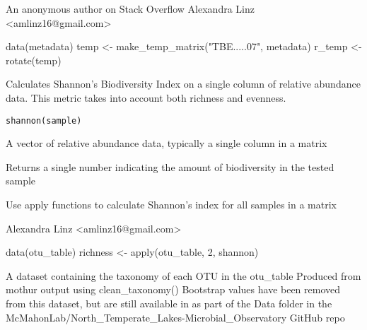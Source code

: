 \documentclass[a4paper]{book}
\begin{document}
%
\begin{Author}\relax
An anonymous author on Stack Overflow
Alexandra Linz <amlinz16@gmail.com>
\end{Author}
%
\begin{Examples}
\begin{ExampleCode}
data(metadata)
temp <- make_temp_matrix("TBE.....07", metadata)
r_temp <- rotate(temp)

\end{ExampleCode}
\end{Examples}
%
\begin{Description}\relax
Calculates Shannon's Biodiversity Index on a single column of relative abundance data. This metric takes into account both richness and evenness.
\end{Description}
%
\begin{Usage}
\begin{verbatim}
shannon(sample)
\end{verbatim}
\end{Usage}
%
\begin{Arguments}
\begin{ldescription}
\item[\code{sample}] 
A vector of relative abundance data, typically a single column in a matrix

\end{ldescription}
\end{Arguments}
%
\begin{Value}
Returns a single number indicating the amount of biodiversity in the tested sample
\end{Value}
%
\begin{Note}\relax
Use apply functions to calculate Shannon's index for all samples in a matrix

\end{Note}
%
\begin{Author}\relax
Alexandra Linz <amlinz16@gmail.com>
\end{Author}
%
\begin{Examples}
\begin{ExampleCode}
data(otu_table)
richness <- apply(otu_table, 2, shannon)
\end{ExampleCode}
\end{Examples}
%
\begin{Description}\relax
A dataset containing the taxonomy of each OTU in the otu\_table
Produced from mothur output using clean\_taxonomy()
Bootstrap values have been removed from this dataset, but are still available in as part of the Data folder in the McMahonLab/North\_Temperate\_Lakes-Microbial\_Observatory GitHub repo
\end{Description}
\end{document}
